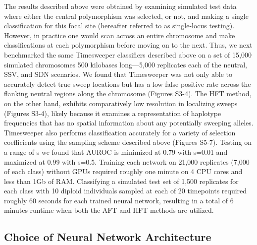 The results described above were obtained by examining simulated test data where either the central polymorphism was selected, or not, and making a single classification for this focal site (hereafter referred to as single-locus testing). However, in practice one would scan across an entire chromosome and make classifications at each polymorphism before moving on to the next. Thus, we next benchmarked the same Timesweeper classifiers described above on a set of 15,000 simulated chromosomes 500 kilobases long—5,000 replicates each of the neutral, SSV, and SDN scenarios. We found that Timesweeper was not only able to accurately detect true sweep locations but has a low false positive rate across the flanking neutral regions along the chromosome (Figures S3-4). The HFT method, on the other hand, exhibits comparatively low resolution in localizing sweeps (Figures S3-4), likely because it examines a representation of haplotype frequencies that has no spatial information about any potentially sweeping alleles. Timesweeper also performs classification accurately for a variety of selection coefficients using the sampling scheme described above (Figures S5-7). Testing on a range of s we found that AUROC is minimized at 0.79 with s=0.01 and maximized at 0.99 with s=0.5. 
Training each network on 21,000 replicates (7,000 of each class) without GPUs required roughly one minute on 4 CPU cores and less than 1Gb of RAM. Classifying a simulated test set of 1,500 replicates for each class with 10 diploid individuals sampled at each of 20 timepoints required roughly 60 seconds for each trained neural network, resulting in a total of 6 minutes runtime when both the AFT and HFT methods are utilized. \\

\subsection{Choice of Neural Network Architecture}

